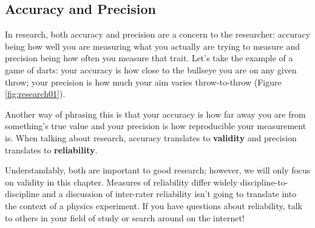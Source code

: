 \subsection{Accuracy and Precision}

In research, both accuracy  and precision  are a concern to the researcher: accuracy being how well you are measuring what you actually are trying to measure and precision being how often you measure that trait. Let's take the example of a game of darts: your accuracy is how close to the bullseye you are on any given throw; your precision is how much your aim varies throw-to-throw (Figure \ref{fig:research01}).

Another way of phrasing this is that your accuracy is how far away you are from something's true value and your precision is how reproducible your measurement is. When talking about research, accuracy translates to \textbf{validity}  and precision  translates to \textbf{reliability}.

Understandably, both are important to good research; however, we will only focus on validity in this chapter. Measures of reliability differ widely discipline-to-discipline and a discussion of inter-rater reliability isn't going to translate into the context of a physics experiment. If you have questions about reliability, talk to others in your field of study or search around on the internet!

